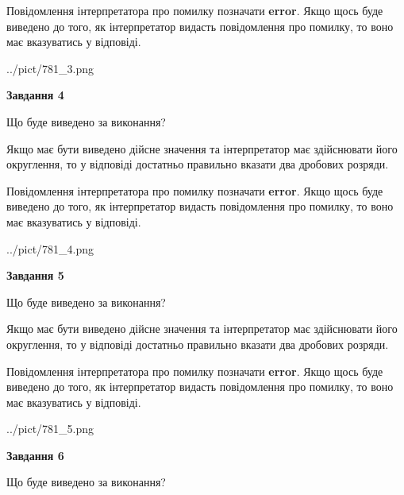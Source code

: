 \documentclass[12pt, ukrainian]{article}
\begin{document}
{\begin {Large}
Повідомлення інтерпретатора про помилку позначати \textbf{error}.
Якщо щось буде виведено до того, як інтерпретатор видасть повідомлення про помилку, 
то воно має вказуватись у відповіді. \par

\begin{center}
	{../pict/781_3.png}
\end{center}
\newpage

{\begin {center}\textbf{Завдання 4}\end {center}}\par
Що буде виведено за виконання? \par

Якщо має бути виведено дійсне значення та інтерпретатор має здійснювати його округлення, 
то у відповіді достатньо правильно вказати два дробових розряди.

Повідомлення інтерпретатора про помилку позначати \textbf{error}.
Якщо щось буде виведено до того, як інтерпретатор видасть повідомлення про помилку, 
то воно має вказуватись у відповіді. \par

\begin{center}
	{../pict/781_4.png}
\end{center}
\newpage

{\begin {center}\textbf{Завдання 5}\end {center}}\par
Що буде виведено за виконання? \par

Якщо має бути виведено дійсне значення та інтерпретатор має здійснювати його округлення, 
то у відповіді достатньо правильно вказати два дробових розряди.

Повідомлення інтерпретатора про помилку позначати \textbf{error}.
Якщо щось буде виведено до того, як інтерпретатор видасть повідомлення про помилку, 
то воно має вказуватись у відповіді. \par

\begin{center}
	{../pict/781_5.png}
\end{center}
\newpage

{\begin {center}\textbf{Завдання 6}\end {center}}\par
Що буде виведено за виконання? \par


\end{Large}}
\end{document}
